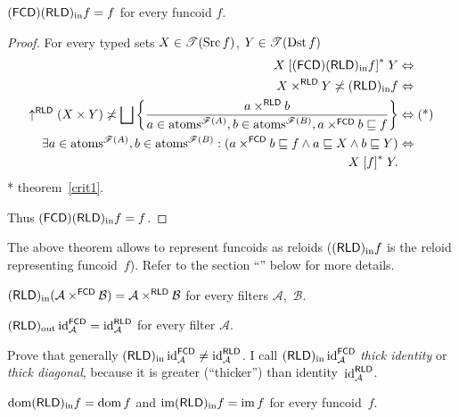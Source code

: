 \begin{thm}
$(\mathsf{FCD})(\mathsf{RLD})_{\mathrm{in}} f=f$ for every funcoid $f$.\end{thm}
\begin{proof}
For every typed sets $X\in\mathscr{T}(\operatorname{Src} f)$, $Y\in\mathscr{T}(\operatorname{Dst} f)$
\begin{align*}
X\mathrel{\left[(\mathsf{FCD})(\mathsf{RLD})_{\mathrm{in}} f\right]^{\ast}}Y & \Leftrightarrow\\
X\times^{\mathsf{RLD}}Y\not\asymp(\mathsf{RLD})_{\mathrm{in}} f & \Leftrightarrow\\
\uparrow^{\mathsf{RLD}}(X\times Y)\not\asymp\bigsqcup\left\{ \frac{a\times^{\mathsf{RLD}}b}{a\in\operatorname{atoms}^{\mathscr{F}(A)},b\in\operatorname{atoms}^{\mathscr{F}(B)},a\times^{\mathsf{FCD}}b\sqsubseteq f}\right\} & \Leftrightarrow\text{(*)}\\
\exists a\in\operatorname{atoms}^{\mathscr{F}(A)},b\in\operatorname{atoms}^{\mathscr{F}(B)}:(a\times^{\mathsf{FCD}}b\sqsubseteq f\land a\sqsubseteq X\land b\sqsubseteq Y) & \Leftrightarrow\\
X\mathrel{\left[f\right]^{\ast}}Y.
\end{align*}
{*} theorem~\ref{crit1}.

Thus $(\mathsf{FCD})(\mathsf{RLD})_{\mathrm{in}} f=f$.\end{proof}
\begin{rem}
The above theorem allows to represent funcoids as reloids ($(\mathsf{RLD})_{\mathrm{in}} f$ is the reloid representing funcoid~$f$). Refer to
the section ``'' below for more details.\end{rem}
\begin{obvious}
$(\mathsf{RLD})_{\mathrm{in}}(\mathcal{A}\times^{\mathsf{FCD}}\mathcal{B})=\mathcal{A}\times^{\mathsf{RLD}}\mathcal{B}$
for every filters $\mathcal{A}$,~$\mathcal{B}$.\end{obvious}
\begin{conjecture}
$(\mathsf{RLD})_{\mathrm{out}}\operatorname{id}_{\mathcal{A}}^{\mathsf{FCD}}=\operatorname{id}_{\mathcal{A}}^{\mathsf{RLD}}$
for every filter $\mathcal{A}$.\end{conjecture}
\begin{xca}
Prove that generally $(\mathsf{RLD})_{\mathrm{in}}\operatorname{id}_{\mathcal{A}}^{\mathsf{FCD}}\ne\operatorname{id}_{\mathcal{A}}^{\mathsf{RLD}}$.
I call $(\mathsf{RLD})_{\mathrm{in}}\operatorname{id}_{\mathcal{A}}^{\mathsf{FCD}}$ \emph{thick identity} or \emph{thick diagonal},
because it is greater (``thicker'') than identity~$\operatorname{id}_{\mathcal{A}}^{\mathsf{RLD}}$.\end{xca}
\begin{prop}
$\operatorname{dom}(\mathsf{RLD})_{\mathrm{in}} f=\operatorname{dom} f$ and $\operatorname{im}(\mathsf{RLD})_{\mathrm{in}} f=\operatorname{im} f$ for every funcoid~$f$.\end{prop}
